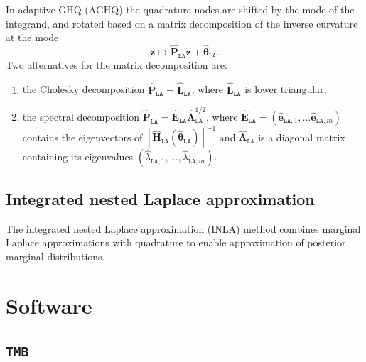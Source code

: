 \documentclass[a4paper, nobind]{templates/ociamthesis}
\providecommand{\tightlist}{%
  \setlength{\itemsep}{0pt}\setlength{\parskip}{0pt}}
\begin{document}
In adaptive GHQ (AGHQ) the quadrature nodes are shifted by the mode of the integrand, and rotated based on a matrix decomposition of the inverse curvature at the mode
\begin{equation}
\mathbf{z} \mapsto \hat{\mathbf{P}}_\texttt{LA} \mathbf{z} + \hat{\boldsymbol{\mathbf{\theta}}}_\texttt{LA}.
\end{equation}
Two alternatives for the matrix decomposition \autocite{jackel2005note} are:

\begin{enumerate}
\def\labelenumi{\arabic{enumi}.}
\tightlist
\item
  the Cholesky decomposition \(\hat{\mathbf{P}}_\texttt{LA} = \hat{\mathbf{L}}_\texttt{LA}\), where \(\hat{\mathbf{L}}_\texttt{LA}\) is lower triangular,
\item
  the spectral decomposition \(\hat{\mathbf{P}}_\texttt{LA} = \hat{\mathbf{E}}_\texttt{LA} \hat{\mathbf{\Lambda}}_\texttt{LA}^{1/2}\), where \(\hat{\mathbf{E}}_\texttt{LA} = (\hat{\mathbf{e}}_{\texttt{LA}, 1}, \ldots \hat{\mathbf{e}}_{\texttt{LA}, m})\) contains the eigenvectors of \([\hat{\mathbf{H}}_\texttt{LA}(\hat{\boldsymbol{\mathbf{\theta}}}_\texttt{LA})]^{-1}\) and \(\hat{\mathbf{\Lambda}}_\texttt{LA}\) is a diagonal matrix containing its eigenvalues \((\hat \lambda_{\texttt{LA}, 1}, \ldots, \hat \lambda_{\texttt{LA}, m})\).
\end{enumerate}

\hypertarget{integrated-nested-laplace-approximation}{%
\subsection{Integrated nested Laplace approximation}\label{integrated-nested-laplace-approximation}}

The integrated nested Laplace approximation (INLA) method \autocite{rue2009approximate} combines marginal Laplace approximations with quadrature to enable approximation of posterior marginal distributions.

\hypertarget{software}{%
\section{Software}\label{software}}

\hypertarget{tmb}{%
\subsection{\texorpdfstring{\texttt{TMB}}{TMB}}\label{tmb}}
\end{document}
